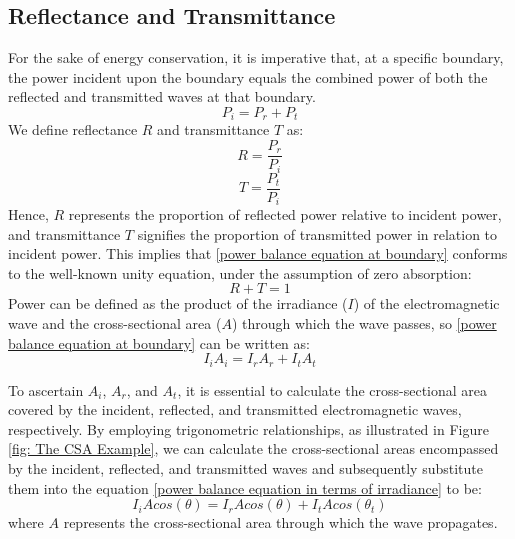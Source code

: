 \subsection{Reflectance and Transmittance}
For the sake of energy conservation, it is imperative that, at a specific boundary, the power incident upon the boundary equals the combined power of both the reflected and transmitted waves at that boundary.
\begin{equation} \label{power balance equation at boundary}
P_i = P_r + P_t
\end{equation}
We define reflectance $R$ and transmittance $T$ as:
\begin{equation} \label{Reflectance}
R = \frac{P_r}{P_i}
\end{equation}
\begin{equation} \label{Transmittance}
T = \frac{P_t}{P_i}
\end{equation}
Hence, $R$ represents the proportion of reflected power relative to incident power, and transmittance $T$ signifies the proportion of transmitted power in relation to incident power. This implies that \ref{power balance equation at boundary} conforms to the well-known unity equation, under the assumption of zero absorption:
\begin{equation} \label{R+T=1}
R + T = 1
\end{equation}
Power can be defined as the product of the irradiance ($I$) of the electromagnetic wave and the cross-sectional area ($A$) through which the wave passes, so \ref{power balance equation at boundary} can be written as:
\begin{equation} \label{power balance equation in terms of irradiance}
I_iA_i = I_rA_r + I_tA_t
\end{equation}

To ascertain $A_i$, $A_r$, and $A_t$, it is essential to calculate the cross-sectional area covered by the incident, reflected, and transmitted electromagnetic waves, respectively. By employing trigonometric relationships, as illustrated in Figure \ref{fig: The CSA Example}, we can calculate the cross-sectional areas encompassed by the incident, reflected, and transmitted waves and subsequently substitute them into the equation \ref{power balance equation in terms of irradiance} to be:
\begin{equation} \label{power balance equations after CSA substitution}
I_iAcos(\theta) = I_rAcos(\theta) + I_tAcos(\theta_t)
\end{equation}
where $A$ represents the cross-sectional area through which the wave propagates.

